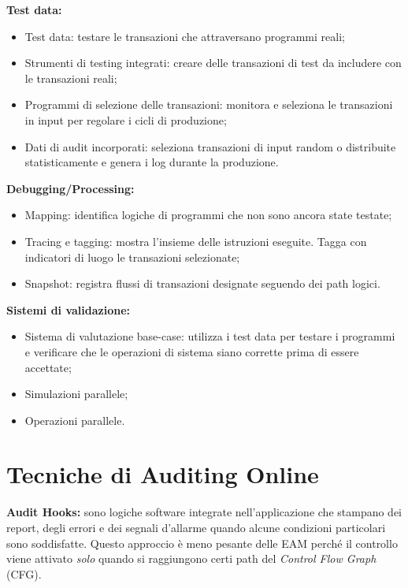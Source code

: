 \textbf{Test data:}
\begin{itemize}
    \item Test data: testare le transazioni che attraversano programmi reali;
    \item Strumenti di testing integrati: creare delle transazioni di test da
    includere con le transazioni reali;
    \item Programmi di selezione delle transazioni: monitora e seleziona le
    transazioni in input per regolare i cicli di produzione;
    \item Dati di audit incorporati: seleziona transazioni di input random o
    distribuite statisticamente e genera i log durante la produzione.
\end{itemize}

\textbf{Debugging/Processing:}

\begin{itemize}
    \item Mapping: identifica logiche di programmi che non
    sono ancora state testate;
    \item Tracing e tagging: mostra l'insieme delle istruzioni eseguite. Tagga
    con indicatori di luogo le
    transazioni selezionate;
    \item Snapshot: registra flussi di transazioni designate seguendo dei path
    logici.
\end{itemize}

\textbf{Sistemi di validazione:}

\begin{itemize}
    \item Sistema di valutazione base-case: utilizza i test data per testare i
    programmi e verificare che
    le operazioni di sistema siano corrette prima di essere accettate;
    \item Simulazioni parallele;
    \item Operazioni parallele.
\end{itemize}

\section{Tecniche di Auditing Online}

\textbf{Audit Hooks:} sono logiche software integrate nell'applicazione
che stampano dei report, degli errori e dei segnali d'allarme 
quando alcune condizioni particolari sono soddisfatte.
Questo approccio è meno pesante delle EAM perché il controllo 
viene attivato \emph{solo} quando si raggiungono certi path
del \textit{Control Flow Graph} (CFG).

